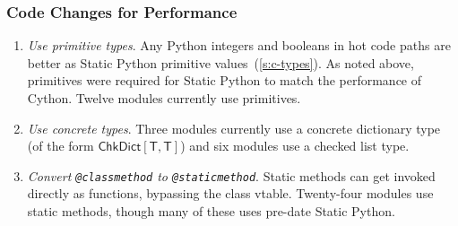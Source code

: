 \documentclass[english,cleveref,submission]{programming}
\newcommand{\SP}{Static Python}
\newcommand{\code}[1]{\texttt{#1}}
\newcommand{\ipara}[1]{\emph{#1}\/.}
\newcommand{\typefont}[1]{\mathsf{#1}}
\newcommand{\paramtype}[2]{#1[#2]}
\newcommand{\sptype}{\typefont{T}}
\newcommand{\sptchkdict}[2]{\paramtype{\typefont{ChkDict}}{#1, #2}}
\begin{document}
\subsubsection{Code Changes for Performance}

\begin{enumerate}
  \item
    \ipara{Use primitive types}
    Any Python integers and booleans in hot code paths are better as
    \SP{} primitive values~(\cref{s:c-types}).
    As noted above, primitives were required for \SP{} to match the performance of
    Cython.
    Twelve modules currently use primitives.

  \item
    \ipara{Use concrete types}
    Three modules currently use a concrete dictionary type
    (of the form $\sptchkdict{\sptype}{\sptype}$)
    and six modules use a checked list type.

  \item
    \ipara{Convert \code{@classmethod} to \code{@staticmethod}}
    Static methods can get invoked directly as functions, bypassing the class vtable.
    Twenty-four modules use static methods, though many of these uses pre-date \SP{}.


\end{enumerate}


\end{document}
